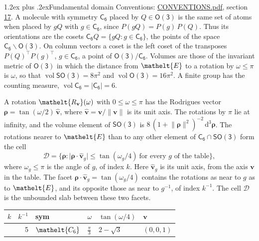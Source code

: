\documentclass[10pt,a4paper]{article}
\makeatletter
\renewcommand\section{\@startsection{section}{1}{\z@}{-3ex plus -1ex minus -.2ex}%
  {1.2ex plus .2ex}{\normalfont\large\sffamily\bfseries\color{parttitle}}}
\numberwithin{equation}{section}
\newcommand{\eltfont}[1]{{\let\sigma\eltsigma\mathelt{#1}}}
\newcommand{\grp}[1]{\mathsf{#1}}
\newcommand{\cls}[1]{\eltfont{#1}}
\newcommand{\elt}[1]{\eltfont{#1}}
\newcommand{\dirvec}[3]{(#1, #2, #3)}
\newcommand{\unitaxis}{\hat{\mathbf{v}}}
\newcommand{\vv}{\mathbf{v}}
\newcommand{\diff}{\mathrm{d}}
\newcommand{\vol}{\operatorname{vol}}
\newcommand{\rodrigues}{\boldsymbol{\rho}}
\newcommand{\fcell}{\mathcal{D}}
\makeatother
\begin{document}
\section{Fundamental domain}\label{s:fundamental_domain}
Conventions: \href{../../CONVENTIONS.pdf}{CONVENTIONS.pdf}, section \href{../../CONVENTIONS.pdf\#conv.17}{17}.
\leavevmode\label{n:element.placement}A molecule with symmetry $\grp{C_{6}}$ placed by $Q \in \grp{O(3)}$ is the same set of atoms when placed by $gQ$ with $g \in \grp{C_{6}}$, since $P(gQ) = P(g)\,P(Q)$. \label{n:operator.cosets}Thus its orientations are the cosets $\grp{C_{6}}Q = \{gQ : g \in \grp{C_{6}}\}$, the points of the space $\grp{C_{6}}\backslash\grp{O(3)}$. On column vectors a coset is the left coset of the transposes $P(Q)^{\top}P(g)^{\top}$, $g \in \grp{C_{6}}$, a point of $\grp{O(3)}/\grp{C_{6}}$.
\leavevmode\label{n:operator.volume}Volumes are those of the invariant metric of \href{O3.pdf}{$\grp{O(3)}$} in which the distance from $\elt{E}$ to a rotation by $\omega \le \pi$ is $\omega$, so that $\vol\grp{SO(3)} = 8\pi^2$ and $\vol\grp{O(3)} = 16\pi^2$. A finite group has the counting measure, $\vol\grp{C_{6}} = |\grp{C_{6}}| = 6$.

\leavevmode\label{n:vector.rodrigues}\label{n:vector.unitaxis}A rotation $\elt{R_{\vv}}(\omega)$ with $0 \le \omega \le \pi$ has the Rodrigues vector $\rodrigues = \tan(\omega/2)\,\unitaxis$, where $\unitaxis = \vv/\lVert\vv\rVert$ is its unit axis. The rotations by $\pi$ lie at infinity, and the volume element of \href{SO3.pdf}{$\grp{SO(3)}$} is $8\,(1 + \lVert\rodrigues\rVert^2)^{-2}\,\diff^3\rodrigues$.
\leavevmode\label{n:set.cell}The rotations nearer to $\elt{E}$ than to any other element of $\grp{C_{6}} \cap \grp{SO(3)}$ form the cell
\begin{equation}\label{e:cell}\fcell = \bigl\{\rodrigues : \lvert\rodrigues\cdot\unitaxis_g\rvert \le \tan(\omega_g/4)\ \text{for every $g$ of the table}\bigr\},\end{equation}
where $\omega_g \le \pi$ is the angle of $g$, of index $k$. Here $\unitaxis_g$ is its unit axis, from the axis $\vv$ in the table. The facet $\rodrigues\cdot\unitaxis_g = \tan(\omega_g/4)$ contains the rotations as near to $g$ as to $\elt{E}$, and its opposite those as near to $g^{-1}$, of index $k^{-1}$. The cell $\fcell$ is the unbounded slab between these two facets.
{\small{\renewcommand{\arraystretch}{1.3}\begin{longtable}{@{}rrllll@{}}\toprule
$k$ & $k^{-1}$ & sym & $\omega$ & $\tan(\omega/4)$ & $\vv$\\\midrule\endhead
\bottomrule\endfoot\endlastfoot
1 & 5 & $\cls{C_{6}}$ & $\tfrac{\pi}{3}$ & $2 - \sqrt{3}$ & $\dirvec{0}{0}{1}$\\
\bottomrule\end{longtable}}}
\end{document}
